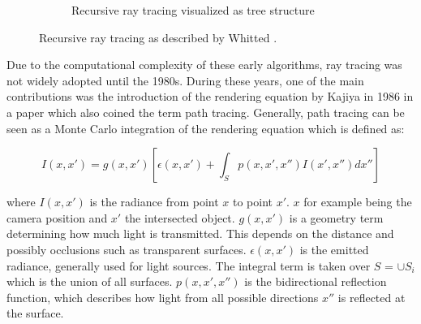 \begin{figure}[H]
\begin{subfigure}[t]{0.45\textwidth}
    \caption{Recursive ray tracing visualized as tree structure}
    \label{fig:recursiveTree}
  \end{subfigure}
  \caption{Recursive ray tracing as described by Whitted \cite{whittedGlobalIllumination}.}
  \label{fig:recursiveRayTracing}
\end{figure}

Due to the computational complexity of these early algorithms, ray tracing was not widely adopted until the 1980s. During these years, one of the main contributions was the introduction of the rendering equation by Kajiya in 1986 in a paper which also coined the term path tracing. Generally, path tracing can be seen as a Monte Carlo integration of the rendering equation which is defined as:

\begin{equation}
  \label{eqn:rendering-equation}
  I(x, x') = g(x, x') [\epsilon(x, x') + \int_{S} p(x, x', x'')I(x', x'')dx'']
\end{equation}

where $I(x, x')$ is the radiance from point $x$ to point $x'$. $x$ for example being the camera position and $x'$ the intersected object. $g(x, x')$ is a geometry term determining how much light is transmitted. This depends on the distance and possibly occlusions such as transparent surfaces. $\epsilon(x, x')$ is the emitted radiance, generally used for light sources. The integral term is taken over $S$ = $\cup S_i$ which is the union of all surfaces. $p(x, x', x'')$ is the bidirectional reflection function, which describes how light from all possible directions $x''$ is reflected at the surface. \cite{kajiya1986rendering}

